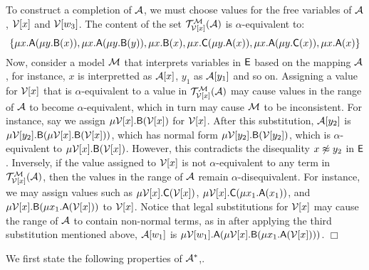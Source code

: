 \begin{example}
To construct a completion of $\mathcal{A}$, we must choose values for the free variables of $\mathcal{A}$, $\mathcal{V}{[ x ]}$ and $\mathcal{V}{[ w_3 ]}$.
The content of the set $\mathcal{T}^{\mathcal{M}}_{\mathcal{V}{[ x ]}}( \mathcal{A} )$ is $\alpha$-equivalent to:
\[%
\{
\mu x. \const{A}( \mu y. \const{B}( x )),
\mu x. \const{A}( \mu y. \const{B}( y )),
\mu x. \const{B}( x ),
\mu x. \const{C}( \mu y. \const{A}( x )),
\mu x. \const{A}( \mu y. \const{C}( x )),
\mu x. \const{A}( x )
\}
\]
Now, consider a model $\mathcal{M}$ that interprets variables in $\mathsf{E}$ based on the mapping $\mathcal{A}$,
for instance, $x$ is interpretted as $\mathcal{A} [ x ]$, $y_1$ as $\mathcal{A} [ y_1 ]$ and so on.
Assigning a value for $\mathcal{V}{[ x ]}$ that is $\alpha$-equivalent to a value in $\mathcal{T}^{\mathcal{M}}_{\mathcal{V}{[ x ]}}( \mathcal{A} )$
may cause values in the range of $\mathcal{A}$ to become $\alpha$-equivalent, 
which in turn may cause $\mathcal{M}$ to be inconsistent.
For instance, say we assign $\mu \mathcal{V}{[ x ]}. \textsf{B}( \mathcal{V}{[ x ]} )$ for $\mathcal{V}{[ x ]}$.
After this substitution, $\mathcal{A} [ y_2 ]$ is $\mu \mathcal{V}{[ y_2 ]}. \textsf{B}( \mu \mathcal{V}{[ x ]}. \textsf{B}( \mathcal{V}{[ x ]} ) )$, 
which has normal form $\mu \mathcal{V}{[ y_2 ]}. \textsf{B}( \mathcal{V}{[ y_2 ]} )$,
which is $\alpha$-equivalent to $\mu \mathcal{V}{[ x ]}. \textsf{B}( \mathcal{V}{[ x ]} )$.
However, this contradicts the disequality $x \not\approx y_2$ in $\mathsf{E}$.
Inversely, if the value assigned to $\mathcal{V}{[ x ]}$ is not $\alpha$-equivalent to any term in $\mathcal{T}^{\mathcal{M}}_{\mathcal{V}{[ x ]}}( \mathcal{A} )$,
then the values in the range of $\mathcal{A}$ remain $\alpha$-disequivalent.
For instance, we may assign values such as 
$\mu \mathcal{V}{[ x ]}. \textsf{C}( \mathcal{V}{[ x ]} )$,
$\mu \mathcal{V}{[ x ]}. \textsf{C}( \mu x_1. \textsf{A}( x_1) )$, and
$\mu \mathcal{V}{[ x ]}. \textsf{B}( \mu x_1. \textsf{A}( \mathcal{V}{[ x ]} ) )$
to $\mathcal{V}{[ x ]}$.
Notice that legal substitutions for $\mathcal{V}{[ x ]}$ may cause the range of $\mathcal{A}$ to contain non-normal terms,
as in after applying the third substitution mentioned above,
$\mathcal{A} [ w_1 ]$ is $\mu \mathcal{V}{[ w_1 ]}. \textsf{A}( \mu \mathcal{V}{[ x ]}. \textsf{B}( \mu x_1. \textsf{A}( \mathcal{V}{[ x ]} ) ) )$.
$\Box$
\end{example}

We first state the following properties of $\mathcal{A}^\ast$,.

